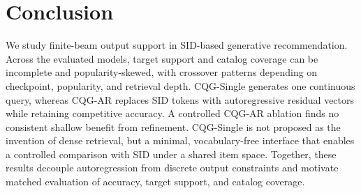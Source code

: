 \documentclass[letterpaper]{article}
\begin{document}
\section{Conclusion}
We study finite-beam output support in SID-based generative recommendation.
Across the evaluated models, target support and catalog coverage can be
incomplete and popularity-skewed, with crossover patterns depending on
checkpoint, popularity, and retrieval depth. CQG-Single generates one
continuous query, whereas CQG-AR replaces SID tokens with autoregressive
residual vectors while retaining competitive accuracy. A controlled CQG-AR
ablation finds no consistent shallow benefit from refinement. CQG-Single is not proposed as the invention of dense retrieval, but a minimal, vocabulary-free interface that enables a controlled comparison with SID under a shared item space.
Together, these results decouple autoregression from discrete output
constraints and motivate matched evaluation of accuracy, target support,
and catalog coverage.


\FloatBarrier

\end{document}
